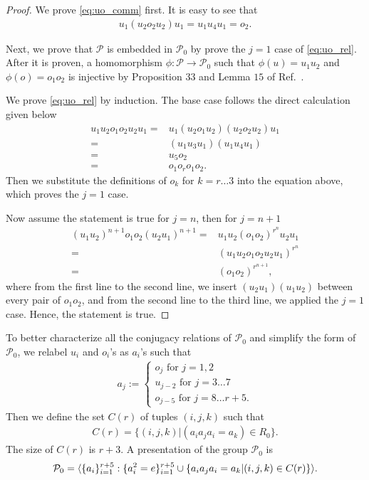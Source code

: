 \documentclass[11pt,letterpaper]{article}
\DeclarePairedDelimiter{\ip}{\langle}{\rangle}
\newcommand{\1}{\mathbb{1}}
\newcommand{\Pg}{\mathcal{P}}
\theoremstyle{definition}
\begin{document}
\begin{proof}
    We prove \cref{eq:uo_comm} first. It is easy to see that
    \begin{align}
        u_1 (u_2o_2u_2) u_1 = u_1u_4u_1 =o_2.
    \end{align}
    
    Next, we prove that $\Pg$ is embedded in $\Pg_0$ by prove the $j = 1$ case of \cref{eq:uo_rel}.
    After it is proven, a homomorphism $\phi: \Pg \rightarrow \Pg_0$ such that $\phi(u) = u_1u_2$ and $\phi(o) = o_1o_2$ is injective by Proposition $33$
    and Lemma $15$ of Ref.~\cite{slofstra2017}.
    
	We prove \cref{eq:uo_rel} by induction.
	The base case follows the direct calculation given below
	\begin{align*} 
		u_1u_2 o_1o_2 u_2u_1 = &u_1 (u_2 o_1u_2) (u_2o_2 u_2) u_1 \\
	=& (u_1 u_3 u_1) (u_1 u_4 u_1)\\
	=& u_5 o_2\\
	=& o_1o_ro_1 o_2.
	\end{align*}
	Then we substitute the definitions of $o_k$ for $k = r \dots 3$ into the equation above, which 
	proves the $j=1$ case.
	
	Now assume the statement is true for $j = n$, then for $j = n+1$
	\begin{align*}
		(u_1u_2)^{n+1} o_1o_2 (u_2u_1)^{n+1} =& u_1u_2 (o_1o_2)^{r^n} u_2u_1 \\ 
		 =& (u_1u_2 o_1o_2 u_2u_1)^{r^n} \\
		 =& (o_1o_2)^{r^{n+1}},
	\end{align*}
	where from the first line to the second line, we insert $(u_2u_1)(u_1u_2)$ between every pair of $o_1o_2$, and
	from the second line to the third line, we applied the $j=1$ case. Hence, the statement is true.
\end{proof}
To better characterize all the conjugacy
relations of $\Pg_0$ and simplify the form of $\Pg_0$, 
we relabel $u_i$ and $o_i$'s
as $a_i$'s such that
\begin{align}
	a_j := 
	\begin{cases}
	 o_j \text{ for } j = 1,2 \\
	 u_{j-2} \text{ for } j = 3\dots 7 \\
	 o_{j-5} \text{ for } j = 8 \dots r+5.
	\end{cases}
\end{align}
Then we define the set $C(r)$ of tuples $(i,j,k)$ such that
\begin{align}
\label{eq:cr}
	C(r) = \{ (i,j,k) |  (a_ia_ja_i = a_k) \in R_0 \}.
\end{align}
The size of $C(r)$ is $r+3$. 
A presentation of the group $\Pg_0$ is
\begin{align*}
    \Pg_0 = \ip{ \{a_i\}_{i=1}^{r+5} : \{a_i^2 =e \}_{i=1}^{r+5} \cup \{ a_ia_ja_i = a_k \vert (i,j,k) \in C(r)\}}.
\end{align*}
\end{document}
